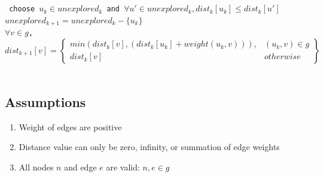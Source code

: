 \documentclass[11pt, oneside]{article}   	%
\newcommand\tab[1][1cm]{\hspace*{#1}}
\theoremstyle{definition}
\begin{document}
\\\\
\texttt{
  \tab\tab choose $u_k \in unexplored_k$ and $\forall u' \in unexplored_k, dist_k[u_k] \leq dist_k[u']$ \\
  \tab\tab $unexplored_{k+1} = unexplored_k - \{u_k\}$                    \\
  \tab\tab $\forall v \in g$, \\
  \tab\[
        dist_{k+1}[v] = \left.
       \begin{cases} 
          min(dist_k[v], (dist_k[u_k] + weight(u_k,v))), & (u_k,v) \in g \\ 
          dist_k[v] & otherwise 
        \end{cases}
        \right\}
      \]
  \tab\tab \\
}

\subsection{Assumptions}
\begin{enumerate}
  \item Weight of edges are positive
  \item Distance value can only be zero, infinity, or summation of edge weights
  \item All nodes $n$ and edge $e$ are valid: $n, e \in g$
\end{enumerate}
\end{document}
